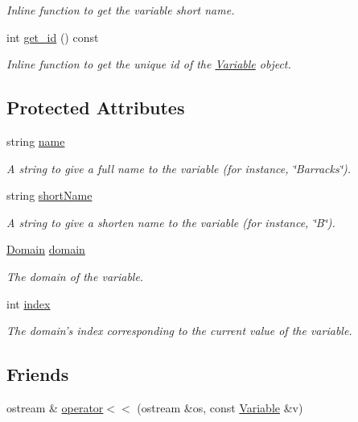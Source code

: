 \begin{DoxyCompactItemize}
\begin{DoxyCompactList}\small\item\em Inline function to get the variable short name. \end{DoxyCompactList}\item 
int \hyperlink{classghost_1_1Variable_adc5da5dedaa3d47a5eb4092b08c3f77c}{get\-\_\-id} () const 
\begin{DoxyCompactList}\small\item\em Inline function to get the unique id of the \hyperlink{classghost_1_1Variable}{Variable} object. \end{DoxyCompactList}\end{DoxyCompactItemize}
\subsection*{Protected Attributes}
\begin{DoxyCompactItemize}
\item 
string \hyperlink{classghost_1_1Variable_a05cf4a4cd3a5c033028e0b0f11d1dafd}{name}
\begin{DoxyCompactList}\small\item\em A string to give a full name to the variable (for instance, \char`\"{}\-Barracks\char`\"{}). \end{DoxyCompactList}\item 
string \hyperlink{classghost_1_1Variable_afb5eb79a7f6351b4305fe082699b6d7d}{short\-Name}
\begin{DoxyCompactList}\small\item\em A string to give a shorten name to the variable (for instance, \char`\"{}\-B\char`\"{}). \end{DoxyCompactList}\item 
\hyperlink{classghost_1_1Domain}{Domain} \hyperlink{classghost_1_1Variable_ab3d7bfa2e8c2139473775a6b797d0991}{domain}
\begin{DoxyCompactList}\small\item\em The domain of the variable. \end{DoxyCompactList}\item 
int \hyperlink{classghost_1_1Variable_a934efa463fb1897b4266040e321dbc41}{index}
\begin{DoxyCompactList}\small\item\em The domain's index corresponding to the current value of the variable. \end{DoxyCompactList}\end{DoxyCompactItemize}
\subsection*{Friends}
\begin{DoxyCompactItemize}
\item 
ostream \& \hyperlink{classghost_1_1Variable_af674a590cfa8082686f61b22cbb15790}{operator$<$$<$} (ostream \&os, const \hyperlink{classghost_1_1Variable}{Variable} \&v)
\end{DoxyCompactItemize}


